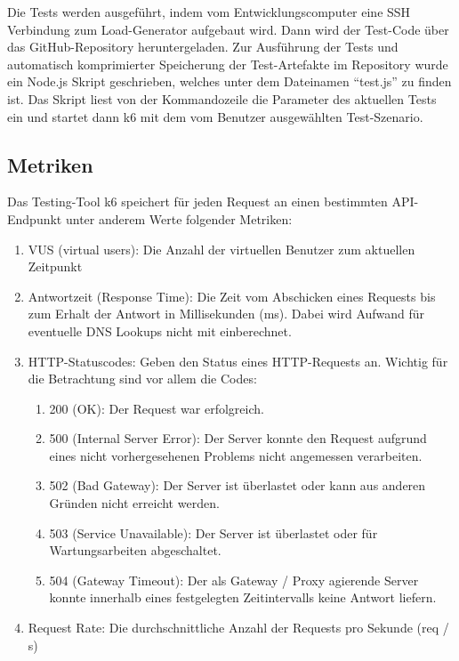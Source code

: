 Die Tests werden ausgeführt, indem vom Entwicklungscomputer eine SSH Verbindung zum Load-Generator aufgebaut wird. Dann wird der Test-Code über das GitHub-Repository heruntergeladen. Zur Ausführung der Tests und automatisch komprimierter Speicherung der Test-Artefakte im Repository wurde ein Node.js Skript geschrieben, welches unter dem Dateinamen "`test.js"' zu finden ist. Das Skript liest von der Kommandozeile die Parameter des aktuellen Tests ein und startet dann k6 mit dem vom Benutzer ausgewählten Test-Szenario. 

\subsection{Metriken}
Das Testing-Tool k6 speichert für jeden Request an einen bestimmten API-Endpunkt unter anderem Werte folgender Metriken:
\begin{enumerate}
    \item VUS (virtual users): Die Anzahl der virtuellen Benutzer zum aktuellen Zeitpunkt 
    
    \item Antwortzeit (Response Time): Die Zeit vom Abschicken eines Requests bis zum Erhalt der Antwort in Millisekunden (ms). Dabei wird Aufwand für eventuelle DNS Lookups nicht mit einberechnet. 
    
    \item HTTP-Statuscodes: Geben den Status eines HTTP-Requests an. Wichtig für die Betrachtung sind vor allem die Codes:
        \begin{enumerate}
            \item 200 (OK): Der Request war erfolgreich\cite{noauthor_200_nodate}.
            \item 500 (Internal Server Error): Der Server konnte den Request aufgrund eines nicht vorhergesehenen Problems nicht angemessen verarbeiten\cite{noauthor_500_nodate}.
            \item 502 (Bad Gateway): Der Server ist überlastet oder kann aus anderen Gründen nicht erreicht werden\cite{noauthor_error_nodate}.
            \item 503 (Service Unavailable): Der Server ist überlastet oder für Wartungsarbeiten abgeschaltet\cite{noauthor_503_nodate}.
            \item 504 (Gateway Timeout): Der als Gateway / Proxy agierende Server konnte innerhalb eines festgelegten Zeitintervalls keine Antwort liefern\cite{noauthor_http_nodate}.
        \end{enumerate}
        
    \item Request Rate: Die durchschnittliche Anzahl der Requests pro Sekunde (req / s)
\end{enumerate}

